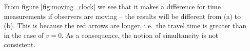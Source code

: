 





From figure \ref{fig:moving_clock} we see that it makes a difference for time measurements if observers are moving -- the results will be different from (a) to (b). This is because the red arrows are longer, i.e.~the travel time is greater than in the case of $v = 0$. As a consequence, the notion of simultaneity is not consistent.

